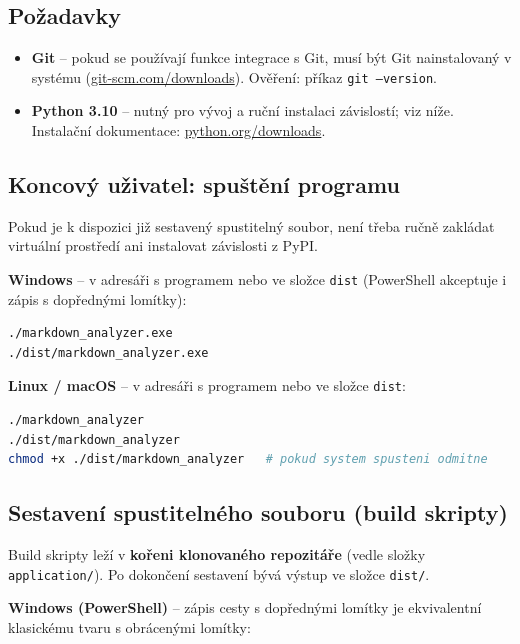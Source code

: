 \documentclass[12pt, a4paper]{article}
\begin{document}
\subsection{Požadavky}

\begin{itemize}
    \item \textbf{Git} -- pokud se používají funkce integrace s Git, musí být Git nainstalovaný v systému (\href{https://git-scm.com/downloads}{git-scm.com/downloads}). Ověření: příkaz \texttt{git --version}.
    \item \textbf{Python 3.10} -- nutný pro vývoj a ruční instalaci závislostí; viz níže. Instalační dokumentace: \href{https://www.python.org/downloads/}{python.org/downloads}.
\end{itemize}

\subsection{Koncový uživatel: spuštění programu}

Pokud je k dispozici již sestavený spustitelný soubor, není třeba ručně zakládat virtuální prostředí ani instalovat závislosti z PyPI.

\textbf{Windows} -- v adresáři s programem nebo ve složce \texttt{dist} (PowerShell akceptuje i zápis s dopřednými lomítky):

\begin{lstlisting}[basicstyle=\ttfamily\small]
./markdown_analyzer.exe
./dist/markdown_analyzer.exe
\end{lstlisting}

\textbf{Linux / macOS} -- v adresáři s programem nebo ve složce \texttt{dist}:

\begin{lstlisting}[language=bash, basicstyle=\ttfamily\small]
./markdown_analyzer
./dist/markdown_analyzer
chmod +x ./dist/markdown_analyzer   # pokud system spusteni odmitne
\end{lstlisting}

\subsection{Sestavení spustitelného souboru (build skripty)}

Build skripty leží v \textbf{kořeni klonovaného repozitáře} (vedle složky \texttt{application/}). Po dokončení sestavení bývá výstup ve složce \texttt{dist/}.

\textbf{Windows (PowerShell)} -- zápis cesty s dopřednými lomítky je ekvivalentní klasickému tvaru s obrácenými lomítky:
\end{document}
